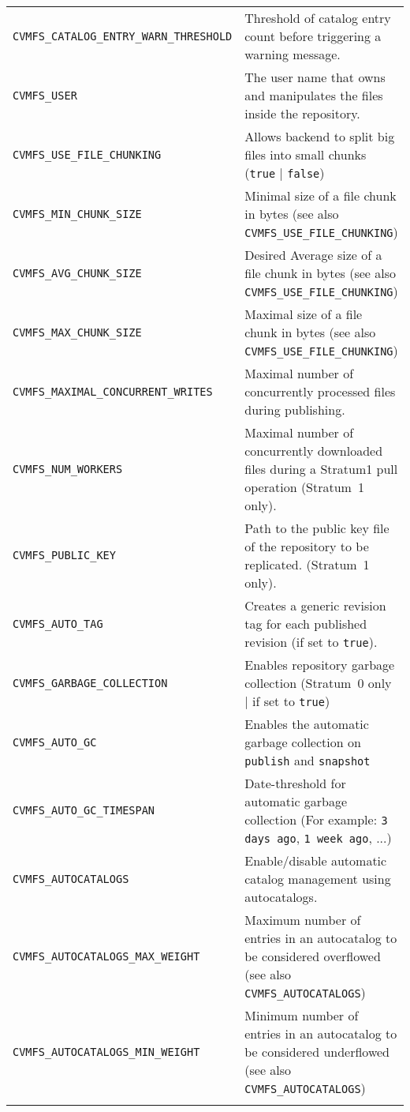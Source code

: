 \begin{longtable}{lX}
		\tt CVMFS\_CATALOG\_ENTRY\_WARN\_THRESHOLD	& Threshold of catalog entry count before triggering a warning message.\\
		\tt CVMFS\_USER						& The user name that owns and manipulates the files inside the repository.\\
		\tt CVMFS\_USE\_FILE\_CHUNKING		& Allows backend to split big files into small chunks (\texttt{true} | \texttt{false})\\
		\tt CVMFS\_MIN\_CHUNK\_SIZE			& Minimal size of a file chunk in bytes \newline (see also \texttt{CVMFS\_USE\_FILE\_CHUNKING})\\
		\tt CVMFS\_AVG\_CHUNK\_SIZE			& Desired Average size of a file chunk in bytes \newline (see also \texttt{CVMFS\_USE\_FILE\_CHUNKING})\\
		\tt CVMFS\_MAX\_CHUNK\_SIZE			& Maximal size of a file chunk in bytes \newline (see also \texttt{CVMFS\_USE\_FILE\_CHUNKING})\\
		\tt CVMFS\_MAXIMAL\_CONCURRENT\_WRITES	& Maximal number of concurrently processed files during publishing.\\
		\tt CVMFS\_NUM\_WORKERS				& Maximal number of concurrently downloaded files during a Stratum1 pull operation (Stratum~1 only).\\
		\tt CVMFS\_PUBLIC\_KEY				& Path to the public key file of the repository to be replicated. (Stratum~1 only).\\
		\tt CVMFS\_AUTO\_TAG					& Creates a generic revision tag for each published revision (if set to \texttt{true}).\\
		\tt CVMFS\_GARBAGE\_COLLECTION		& Enables repository garbage collection \newline (Stratum~0 only | if set to \texttt{true})\\
		\tt CVMFS\_AUTO\_GC					& Enables the automatic garbage collection on \texttt{publish} and \texttt{snapshot}\\
		\tt CVMFS\_AUTO\_GC\_TIMESPAN		& Date-threshold for automatic garbage collection \newline (For example: \texttt{3 days ago}, \texttt{1 week ago}, ...)\\
    \tt CVMFS\_AUTOCATALOGS                 & Enable/disable automatic catalog management using autocatalogs.\\
    \tt CVMFS\_AUTOCATALOGS\_MAX\_WEIGHT    & Maximum number of entries in an autocatalog to be considered overflowed \newline (see also \texttt{CVMFS\_AUTOCATALOGS})\\
    \tt CVMFS\_AUTOCATALOGS\_MIN\_WEIGHT    & Minimum number of entries in an autocatalog to be considered underflowed \newline (see also \texttt{CVMFS\_AUTOCATALOGS})\\
		\bottomrule

		\label{tab:serverparameters}
	\end{longtable}
